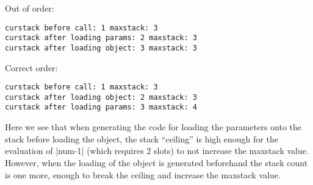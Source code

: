 \documentclass[paper=a4, fontsize=11pt]{scrartcl} %
\numberwithin{equation}{section} %
\numberwithin{figure}{section} %
\numberwithin{table}{section} %
\begin{document}
Out of order:
\begin{verbatim}
curstack before call: 1 maxstack: 3
curstack after loading params: 2 maxstack: 3
curstack after loading object: 3 maxstack: 3
\end{verbatim}
Correct order:
\begin{verbatim}
curstack before call: 1 maxstack: 3
curstack after loading object: 2 maxstack: 3
curstack after loading params: 3 maxstack: 4
\end{verbatim}

Here we see that when generating the code for loading the parameters onto the stack before loading the object, the stack “ceiling” is high enough for the evaluation of |num-1| (which requires 2 slots) to not increase the maxstack value.
However, when the loading of the object is generated beforehand the stack count is one more, enough to break the ceiling and increase the maxstack value.\\
\end{document}
